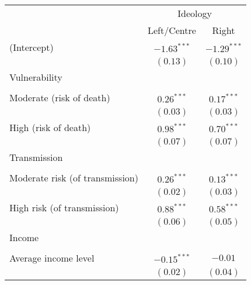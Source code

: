 
\begin{table}
\begin{center}
\begin{scriptsize}
\begin{tabular}{l c c}
\hline
 & \multicolumn{2}{c}{Ideology} \\
\cline{2-3}
 & Left/Centre & Right \\
\hline
(Intercept)                                     & $-1.63^{***}$ & $-1.29^{***}$ \\
                                                & $(0.13)$      & $(0.10)$      \\
Vulnerability                                   &               &               \\
                                                &               &               \\
\quad Moderate (risk of death)                  & $0.26^{***}$  & $0.17^{***}$  \\
                                                & $(0.03)$      & $(0.03)$      \\
\quad High (risk of death)                      & $0.98^{***}$  & $0.70^{***}$  \\
                                                & $(0.07)$      & $(0.07)$      \\
Transmission                                    &               &               \\
                                                &               &               \\
\quad Moderate risk (of transmission)           & $0.26^{***}$  & $0.13^{***}$  \\
                                                & $(0.02)$      & $(0.03)$      \\
\quad High risk (of transmission)               & $0.88^{***}$  & $0.58^{***}$  \\
                                                & $(0.06)$      & $(0.05)$      \\
Income                                          &               &               \\
                                                &               &               \\
\quad Average income level                      & $-0.15^{***}$ & $-0.01$       \\
                                                & $(0.02)$      & $(0.04)$      \\

\end{tabular}
\end{scriptsize}
\end{center}
\end{table}
